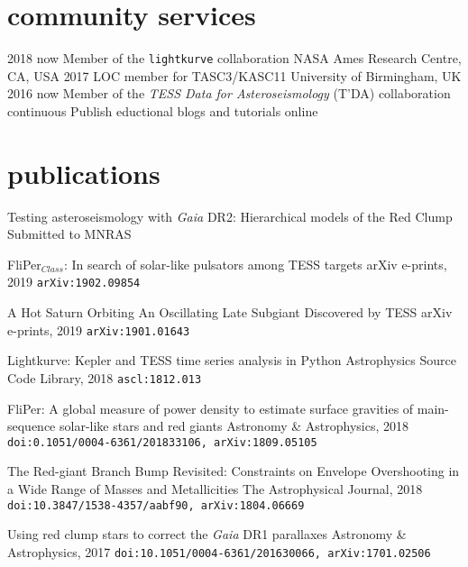 \documentclass[]{k-cv} %
\begin{document}
\clearpage
{}

\section{community services}
\begin{entrylist}
\entrythree
{2018 \to now}
{Member of the \texttt{lightkurve} collaboration}
{NASA Ames Research Centre, CA, USA}
\entrythree
{2017}
{LOC member for TASC3/KASC11}
{University of Birmingham, UK}
\entrythree
{2016 \to now}
{Member of the \emph{TESS Data for Asteroseismology} (T'DA) collaboration }
{}
\entrythree
{continuous}
{Publish eductional blogs and tutorials online}
{}
\end{entrylist}
\section{publications}
{Testing asteroseismology with \textit{Gaia} DR2: Hierarchical models of the Red Clump}
{Submitted to MNRAS}
{}


{FliPer$_{Class}$: In search of solar-like pulsators among TESS targets}
{arXiv e-prints, 2019}
{\texttt{arXiv:1902.09854}}

{{A Hot Saturn Orbiting An Oscillating Late Subgiant Discovered by TESS}}
{arXiv e-prints, 2019}
{\texttt{arXiv:1901.01643}}

{Lightkurve: Kepler and TESS time series analysis in Python}
{Astrophysics Source Code Library, 2018}
{\texttt{ascl:1812.013}}

{FliPer: A global measure of power density to estimate surface gravities of main-sequence solar-like stars and red giants}
{Astronomy \& Astrophysics, 2018}
{\texttt{doi:0.1051/0004-6361/201833106, arXiv:1809.05105}}

{The Red-giant Branch Bump Revisited: Constraints on Envelope Overshooting in a Wide Range of Masses and Metallicities}
{The Astrophysical Journal, 2018}
{\texttt{doi:10.3847/1538-4357/aabf90, arXiv:1804.06669}}

{Using red clump stars to correct the \emph{Gaia} DR1 parallaxes}
{Astronomy \& Astrophysics, 2017}
{\texttt{doi:10.1051/0004-6361/201630066, arXiv:1701.02506}}
\end{document}
